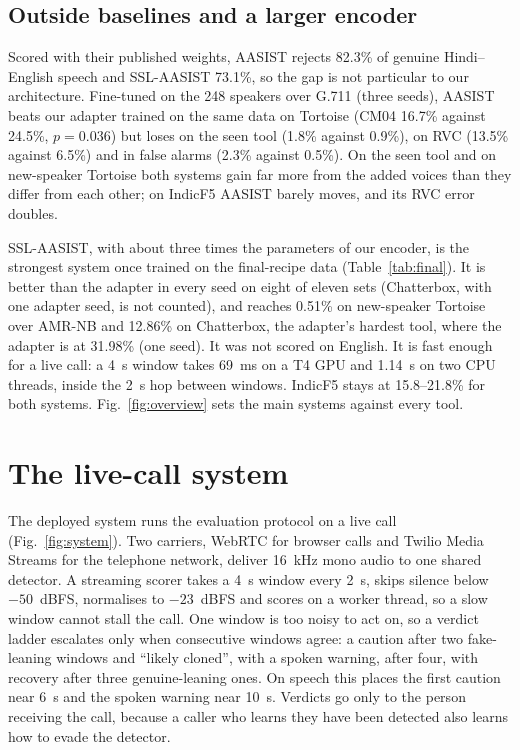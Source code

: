 \documentclass[conference]{IEEEtran}
\begin{document}
\subsection{Outside baselines and a larger encoder}

Scored with their published weights, AASIST rejects 82.3\% of genuine Hindi--English
speech and SSL-AASIST 73.1\%, so the gap is not particular to our architecture. Fine-tuned
on the 248 speakers over G.711 (three seeds), AASIST beats our adapter trained on the same
data on Tortoise (CM04 16.7\% against 24.5\%,
$p = 0.036$) but loses on the seen tool (1.8\% against 0.9\%), on RVC (13.5\% against
6.5\%) and in false alarms (2.3\% against 0.5\%). On the seen tool and on new-speaker
Tortoise both systems gain far more from the added voices than they differ from each other; on
IndicF5 AASIST barely moves, and its RVC error doubles.

SSL-AASIST, with about three times the parameters of our encoder, is the strongest system
once trained on the final-recipe data (Table~\ref{tab:final}). It is better than the
adapter in every seed on eight of eleven sets (Chatterbox, with one adapter seed, is not
counted), and reaches 0.51\% on new-speaker Tortoise over AMR-NB and 12.86\% on Chatterbox,
the adapter's hardest tool, where the adapter is at 31.98\% (one seed). It was not scored on
English.
It is fast enough for a live call: a 4~s window takes 69~ms on a T4 GPU and 1.14~s on two
CPU threads, inside the 2~s hop between windows. IndicF5 stays at 15.8--21.8\% for both
systems. Fig.~\ref{fig:overview} sets the main systems against every tool.

\section{The live-call system}

The deployed system runs the evaluation protocol on a live call (Fig.~\ref{fig:system}).
Two carriers, WebRTC for browser calls and Twilio Media Streams for the telephone network,
deliver 16~kHz mono audio to one shared detector. A streaming scorer takes a 4~s window
every 2~s, skips silence below $-50$~dBFS, normalises to $-23$~dBFS and scores on a worker
thread, so a slow window cannot stall the call. One window is too noisy to act on, so a
verdict ladder escalates only when consecutive windows agree: a caution after two
fake-leaning windows and ``likely cloned'', with a spoken warning, after four, with recovery
after three genuine-leaning ones. On speech this places the first caution near 6~s and the
spoken warning near 10~s. Verdicts
go only to the person receiving the call, because a caller who learns they have been
detected also learns how to evade the detector.
\end{document}
